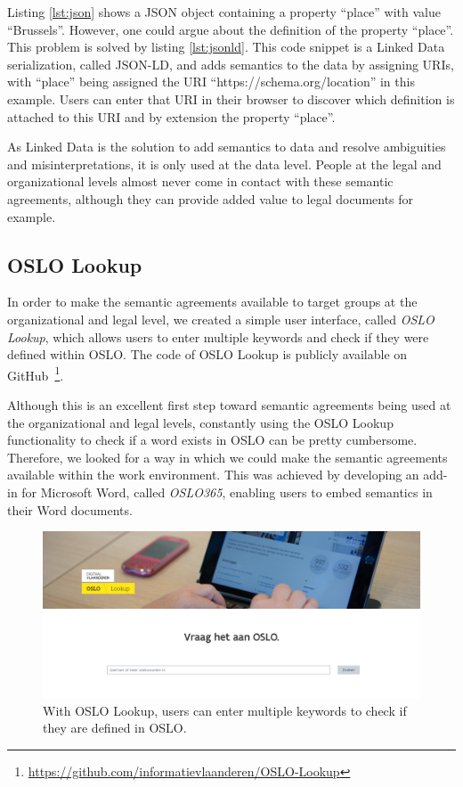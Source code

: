 \documentclass[manuscript]{acmart}
\begin{document}
Listing \ref{lst:json} shows a JSON object containing a property ``place'' with value ``Brussels''.
However, one could argue about the definition of the property ``place''.
This problem is solved by listing \ref{lst:jsonld}. 
This code snippet is a Linked Data serialization, called JSON-LD, and adds semantics to the data by assigning URIs, with ``place'' being assigned the URI ``https://schema.org/location'' in this example. 
Users can enter that URI in their browser to discover which definition is attached to this URI and by extension the property ``place''.

As Linked Data is the solution to add semantics to data and resolve ambiguities and misinterpretations, it is only used at the data level.
People at the legal and organizational levels almost never come in contact with these semantic agreements, although they can provide added value to legal documents for example.

\subsection{OSLO Lookup}

In order to make the semantic agreements available to target groups at the organizational and legal level, we created a simple user interface, called \textit{OSLO Lookup}, which allows users to enter multiple keywords and check if they were defined within OSLO.
The code of OSLO Lookup is publicly available on GitHub~\footnote{\url{https://github.com/informatievlaanderen/OSLO-Lookup}}.

Although this is an excellent first step toward semantic agreements being used at the organizational and legal levels, constantly using the OSLO Lookup functionality to check if a word exists in OSLO can be pretty cumbersome.
Therefore, we looked for a way in which we could make the semantic agreements available within the work environment. This was achieved by developing an add-in for Microsoft Word, called \textit{OSLO365}, enabling users to embed semantics in their Word documents.

\begin{figure}[h]
  \centering
  \includegraphics[width=\linewidth]{images/oslo-lookup}
  \caption{With OSLO Lookup, users can enter multiple keywords to check if they are defined in OSLO.}
  \label{osloLookup}
\end{figure}
\end{document}
